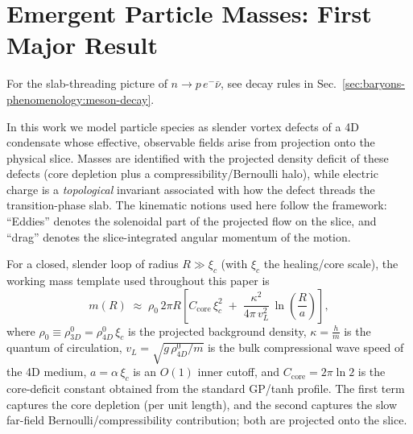 \section{Emergent Particle Masses: First Major Result}\label{sec:emergent-particles}


For the slab-threading picture of $n\!\to\! p\,e^-\bar\nu$, see decay rules in Sec.~\ref{sec:baryons-phenomenology:meson-decay}.
\medskip

In this work we model particle species as slender vortex defects of a 4D condensate whose effective, observable fields arise from projection onto the physical slice. Masses are identified with the projected density deficit of these defects (core depletion plus a compressibility/Bernoulli halo), while electric charge is a \emph{topological} invariant associated with how the defect threads the transition-phase slab. The kinematic notions used here follow the framework: ``Eddies'' denotes the solenoidal part of the projected flow on the slice, and ``drag'' denotes the slice-integrated angular momentum of the motion.

For a closed, slender loop of radius $R\gg\xi_c$ (with $\xi_c$ the healing/core scale), the working mass template used throughout this paper is
\begin{equation}
\label{eq:mass-template}
m(R)\;\approx\;\rho_0\,2\pi R\left[
C_{\mathrm{core}}\,\xi_c^2\;+\;\frac{\kappa^2}{4\pi\,v_L^2}\,
\ln\!\left(\frac{R}{a}\right)\right],
\end{equation}
where $\rho_0\equiv \rho_{3D}^0=\rho_{4D}^0\,\xi_c$ is the projected background density, $\kappa=\frac{h}{m}$ is the quantum of circulation, $v_L=\sqrt{g\,\rho_{4D}^0/m}$ is the bulk compressional wave speed of the 4D medium, $a=\alpha\,\xi_c$ is an $O(1)$ inner cutoff, and $C_{\mathrm{core}}=2\pi\ln 2$ is the core-deficit constant obtained from the standard GP/tanh profile. The first term captures the core depletion (per unit length), and the second captures the slow far-field Bernoulli/compressibility contribution; both are projected onto the slice.

